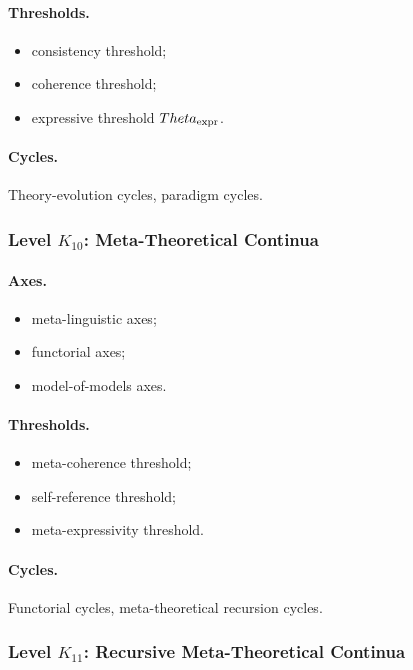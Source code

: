\paragraph{Thresholds.}
\begin{itemize}
    \item consistency threshold;
    \item coherence threshold;
    \item expressive threshold \(\Theta_{\rm expr}\).
\end{itemize}

\paragraph{Cycles.}
Theory-evolution cycles, paradigm cycles.

\subsubsection{Level \(K_{10}\): Meta-Theoretical Continua}

\paragraph{Axes.}
\begin{itemize}
    \item meta-linguistic axes;
    \item functorial axes;
    \item model-of-models axes.
\end{itemize}

\paragraph{Thresholds.}
\begin{itemize}
    \item meta-coherence threshold;
    \item self-reference threshold;
    \item meta-expressivity threshold.
\end{itemize}

\paragraph{Cycles.}
Functorial cycles, meta-theoretical recursion cycles.

\subsubsection{Level \(K_{11}\): Recursive Meta-Theoretical Continua}

